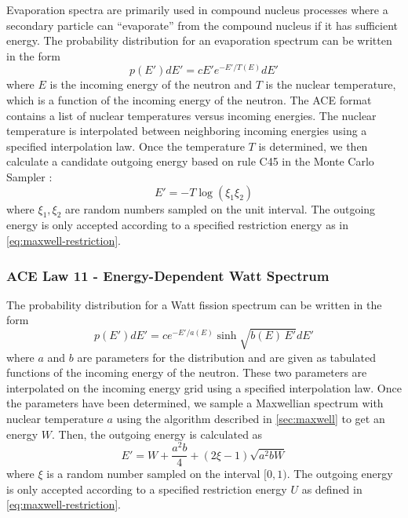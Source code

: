 Evaporation spectra are primarily used in compound nucleus processes where a
secondary particle can ``evaporate'' from the compound nucleus if it has
sufficient energy. The probability distribution for an evaporation spectrum can
be written in the form
\begin{equation}
  \label{eq:evaporation-spectrum}
  p(E') dE' = c E' e^{-E'/T(E)} dE'
\end{equation}
where $E$ is the incoming energy of the neutron and $T$ is the nuclear
temperature, which is a function of the incoming energy of the neutron. The ACE
format contains a list of nuclear temperatures versus incoming energies. The
nuclear temperature is interpolated between neighboring incoming energies using
a specified interpolation law. Once the temperature $T$ is determined, we then
calculate a candidate outgoing energy based on rule C45 in the Monte Carlo
Sampler \cite{lanl-everett-1983}:
\begin{equation}
  \label{eq:evaporation-E}
  E' = -T \log (\xi_1 \xi_2)
\end{equation}
where $\xi_1, \xi_2$ are random numbers sampled on the unit interval. The
outgoing energy is only accepted according to a specified restriction energy as
in \eqref{eq:maxwell-restriction}.

\subsubsection{ACE Law 11 - Energy-Dependent Watt Spectrum}

The probability distribution for a Watt fission spectrum
\cite{physrev-watt-1952} can be written in the form
\begin{equation}
  \label{eq:watt-spectrum}
  p(E') dE' = c e^{-E'/a(E)} \sinh \sqrt{b(E) \, E'} dE'
\end{equation}
where $a$ and $b$ are parameters for the distribution and are given as tabulated
functions of the incoming energy of the neutron. These two parameters are
interpolated on the incoming energy grid using a specified interpolation
law. Once the parameters have been determined, we sample a Maxwellian spectrum
with nuclear temperature $a$ using the algorithm described in
\autoref{sec:maxwell} to get an energy $W$. Then, the outgoing energy is
calculated as
\begin{equation}
  \label{eq:watt-E}
  E' = W + \frac{a^2 b}{4} + (2\xi - 1) \sqrt{a^2 b W}
\end{equation}
where $\xi$ is a random number sampled on the interval $[0,1)$. The outgoing
  energy is only accepted according to a specified restriction energy $U$ as
  defined in \eqref{eq:maxwell-restriction}.

